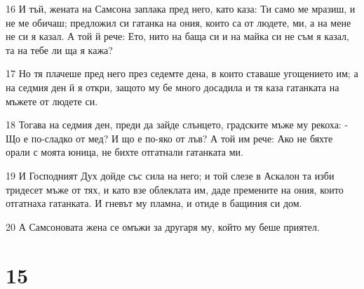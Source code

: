 \par 16 И тъй, жената на Самсона заплака пред него, като каза: Ти само ме мразиш, и не ме обичаш; предложил си гатанка на ония, които са от людете, ми, а на мене не си я казал. А той й рече: Ето, нито на баща си и на майка си не съм я казал, та на тебе ли ща я кажа?
\par 17 Но тя плачеше пред него през седемте дена, в които ставаше угощението им; а на седмия ден й я откри, защото му бе много досадила и тя каза гатанката на мъжете от людете си.
\par 18 Тогава на седмия ден, преди да зайде слънцето, градските мъже му рекоха: - Що е по-сладко от мед? И що е по-яко от лъв? А той им рече: Ако не бяхте орали с моята юница, не бихте отгатнали гатанката ми.
\par 19 И Господният Дух дойде със сила на него; и той слезе в Аскалон та изби тридесет мъже от тях, и като взе облеклата им, даде премените на ония, които отгатнаха гатанката. И гневът му пламна, и отиде в бащиния си дом.
\par 20 А Самсоновата жена се омъжи за другаря му, който му беше приятел.

\chapter{15}

